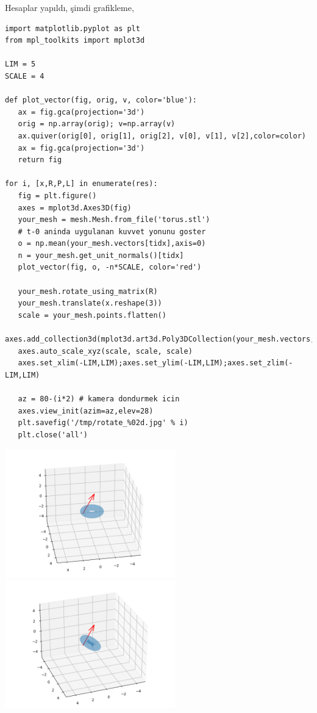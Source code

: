 \documentclass[12pt,fleqn]{article}\usepackage{../../common}
\begin{document}
Hesaplar yapıldı, şimdi grafikleme,

\begin{verbatim}
import matplotlib.pyplot as plt
from mpl_toolkits import mplot3d

LIM = 5
SCALE = 4

def plot_vector(fig, orig, v, color='blue'):
   ax = fig.gca(projection='3d')
   orig = np.array(orig); v=np.array(v)
   ax.quiver(orig[0], orig[1], orig[2], v[0], v[1], v[2],color=color)
   ax = fig.gca(projection='3d')  
   return fig

for i, [x,R,P,L] in enumerate(res):
   fig = plt.figure()
   axes = mplot3d.Axes3D(fig)
   your_mesh = mesh.Mesh.from_file('torus.stl')
   # t-0 aninda uygulanan kuvvet yonunu goster
   o = np.mean(your_mesh.vectors[tidx],axis=0)
   n = your_mesh.get_unit_normals()[tidx]
   plot_vector(fig, o, -n*SCALE, color='red')
   
   your_mesh.rotate_using_matrix(R)
   your_mesh.translate(x.reshape(3))
   scale = your_mesh.points.flatten()
   axes.add_collection3d(mplot3d.art3d.Poly3DCollection(your_mesh.vectors,alpha=0.3))
   axes.auto_scale_xyz(scale, scale, scale)
   axes.set_xlim(-LIM,LIM);axes.set_ylim(-LIM,LIM);axes.set_zlim(-LIM,LIM)

   az = 80-(i*2) # kamera dondurmek icin
   axes.view_init(azim=az,elev=28)
   plt.savefig('/tmp/rotate_%02d.jpg' % i)
   plt.close('all')    
\end{verbatim}

\includegraphics[width=20em]{sim2/rotate_00.png}
\includegraphics[width=20em]{sim2/rotate_05.png}
\end{document}
